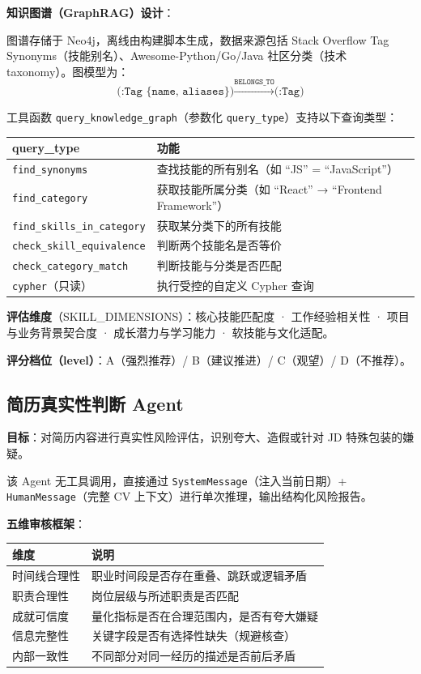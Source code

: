 \documentclass[12pt,a4paper]{ctexart}
\begin{document}
\textbf{知识图谱（GraphRAG）设计}：

图谱存储于 Neo4j，离线由构建脚本生成，数据来源包括 Stack Overflow Tag Synonyms（技能别名）、Awesome-Python/Go/Java 社区分类（技术 taxonomy）。图模型为：
\[
\texttt{(:Tag \{name, aliases\})} \xrightarrow{\texttt{BELONGS\_TO}} \texttt{(:Tag)}
\]

工具函数 \texttt{query\_knowledge\_graph}（参数化 \texttt{query\_type}）支持以下查询类型：

\begin{center}
\renewcommand{\arraystretch}{1.3}
{\small
\begin{tabular}{L{4.8cm} L{7.4cm}}
\toprule
\textbf{query\_type} & \textbf{功能} \\
\midrule
\texttt{find\_synonyms} & 查找技能的所有别名（如 ``JS'' = ``JavaScript''） \\
\texttt{find\_category} & 获取技能所属分类（如 ``React'' → ``Frontend Framework''） \\
\texttt{find\_skills\_in\_category} & 获取某分类下的所有技能 \\
\texttt{check\_skill\_equivalence} & 判断两个技能名是否等价 \\
\texttt{check\_category\_match} & 判断技能与分类是否匹配 \\
\texttt{cypher}（只读） & 执行受控的自定义 Cypher 查询 \\
\bottomrule
\end{tabular}
}
\end{center}

\textbf{评估维度}（SKILL\_DIMENSIONS）：核心技能匹配度 · 工作经验相关性 · 项目与业务背景契合度 · 成长潜力与学习能力 · 软技能与文化适配。

\textbf{评分档位（level）}：A（强烈推荐）/ B（建议推进）/ C（观望）/ D（不推荐）。

\subsection{简历真实性判断 Agent}

\textbf{目标}：对简历内容进行真实性风险评估，识别夸大、造假或针对 JD 特殊包装的嫌疑。

该 Agent 无工具调用，直接通过 \texttt{SystemMessage}（注入当前日期）+ \texttt{HumanMessage}（完整 CV 上下文）进行单次推理，输出结构化风险报告。

\textbf{五维审核框架}：

\begin{center}
\renewcommand{\arraystretch}{1.3}
\begin{tabular}{L{3.4cm} L{9cm}}
\toprule
\textbf{维度} & \textbf{说明} \\
\midrule
时间线合理性 & 职业时间段是否存在重叠、跳跃或逻辑矛盾 \\
职责合理性 & 岗位层级与所述职责是否匹配 \\
成就可信度 & 量化指标是否在合理范围内，是否有夸大嫌疑 \\
信息完整性 & 关键字段是否有选择性缺失（规避核查） \\
内部一致性 & 不同部分对同一经历的描述是否前后矛盾 \\
\bottomrule
\end{tabular}
\end{center}
\end{document}
